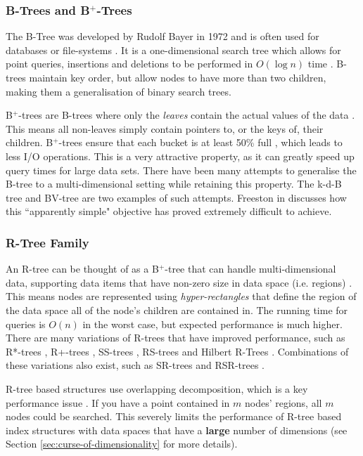 \subsubsection{B-Trees and B${}^{+}$-Trees}

The B-Tree was developed by Rudolf Bayer in 1972 and is often used for databases or file-systems \cite{ubiquitous-btree}. It is a one-dimensional search tree which allows for point queries, insertions and deletions to be performed in $O(\log n)$ time \cite{btree}. B-trees maintain key order, but allow nodes to have more than two children, making them a generalisation of binary search trees.

B${}^{+}$-trees are B-trees where only the \textit{leaves} contain the actual values of the data \cite{ubiquitous-btree}. This means all non-leaves simply contain pointers to, or the keys of, their children. B${}^{+}$-trees ensure that each bucket is at least 50\% full \cite{md-structures-samet, ubiquitous-btree}, which leads to less I/O operations. This is a very attractive property, as it can greatly speed up query times for large data sets. There have been many attempts to generalise the B-tree to a multi-dimensional setting while retaining this property. The k-d-B tree \cite{kdb-tree} and BV-tree \cite{bv-tree} are two examples of such attempts. Freeston in \cite{bv-tree} discusses how this ``apparently simple" objective has proved extremely difficult to achieve.

\subsubsection{R-Tree Family}

An R-tree can be thought of as a B${}^{+}$-tree that can handle multi-dimensional data, supporting data items that have non-zero size in data space (i.e. regions) \cite{r-tree}. This means nodes are represented using \textit{hyper-rectangles} that define the region of the data space all of the node's children are contained in. The running time for queries is $O(n)$ in the worst case, but expected performance is much higher. There are many variations of R-trees that have improved performance, such as R*-trees \cite{rstar-tree}, R+-trees \cite{rplus-tree}, SS-trees \cite{ss-tree}, RS-trees \cite{rs-tree} and Hilbert R-Trees \cite{hilbert-rtree}. Combinations of these variations also exist, such as SR-trees \cite{md-structures-samet} and RSR-trees \cite{rsr-tree}.

R-tree based structures use overlapping decomposition, which is a key performance issue \cite{pyramid-tree}. If you have a point contained in $m$ nodes' regions, all $m$ nodes could be searched. This severely limits the performance of R-tree based index structures with data spaces that have a \textbf{large} number of dimensions (see Section \ref{sec:curse-of-dimensionality} for more details).

